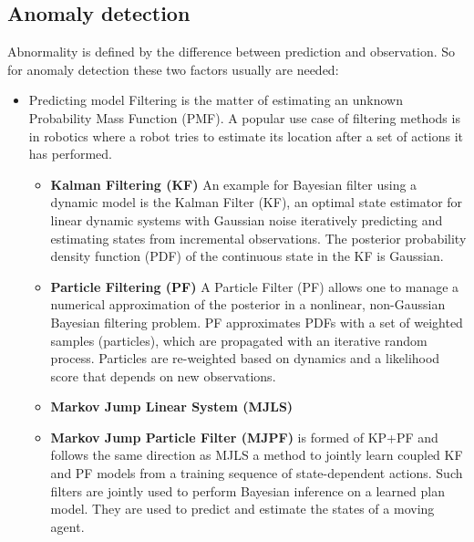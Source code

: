 \documentclass{article}
\begin{document}
			\subsection{Anomaly detection}
				Abnormality is defined by the difference between prediction and observation. So for anomaly detection these two factors usually are needed:
				\begin{itemize}
					\item Predicting model
						Filtering is the matter of estimating an unknown Probability Mass Function (PMF). A popular use case of filtering methods is in robotics where a robot tries to estimate its location after a set of actions it has performed.
						\begin{itemize}
							\item \textbf{Kalman Filtering (KF)} \cite{simon-2010-kalman-filtering-with-state-constraints-a-survey-of-linear-and-nonlinear-algorithms}
							An example for Bayesian filter using a dynamic model is the Kalman Filter (KF), an optimal state estimator for linear
							dynamic systems with Gaussian noise iteratively predicting and estimating states from incremental observations. The
							posterior probability density function (PDF) of the continuous state in the KF is Gaussian.
							\item \textbf{Particle Filtering (PF)} \cite{gustafsson-2010-particle-filter-theory-and-practice-with-positioning-applications}
							A Particle Filter (PF) allows one
							to manage a numerical approximation of the posterior in a
							nonlinear, non-Gaussian Bayesian filtering problem. PF
							approximates PDFs with a set of weighted samples (particles),
							which are propagated with an iterative random process. Particles are re-weighted based on dynamics and a likelihood score
							that depends on new observations.
							\item \textbf{Markov Jump Linear System (MJLS)} \cite{doucet-2001-particle-filters-for-state-estimation-of-jump-markov-linear-systems}
							\item \textbf{Markov Jump Particle Filter (MJPF)} is formed of KP+PF and follows the same direction as MJLS
								\cite{baydoun-2018-learning-switching-models-for-abnormality-detection-for-autonomous-driving}
								a method to jointly learn coupled
								KF and PF models from a training sequence of state-dependent
								actions. Such filters are jointly used to perform Bayesian
								inference on a learned plan model. They are used to predict
								and estimate the states of a moving agent.

\end{itemize}
\end{itemize}
\end{document}
